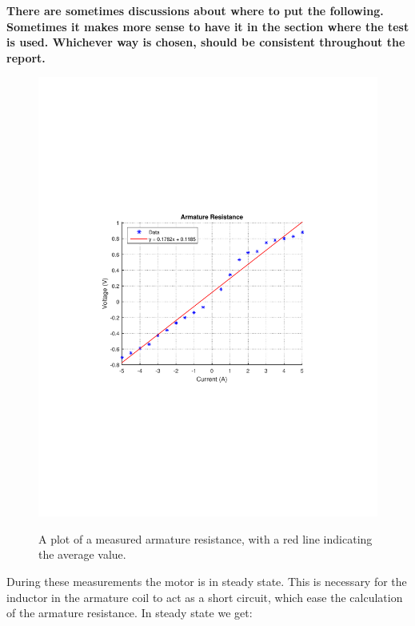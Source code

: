 \textbf{There are sometimes discussions about where to put the following. Sometimes it makes more sense to have it in the section where the test is used. Whichever way is chosen, should be consistent throughout the report.}

\begin{figure}[H]
  \centering
  {
    \includegraphics[width=\textwidth]{figures/armatureResistance.pdf}
  }
  \caption{A plot of a measured armature resistance, with a red line indicating the average value.}
  \label{armatureResistance}
\end{figure}

During these measurements the motor is in steady state. This is necessary for the inductor in the armature coil to act as a short circuit, which ease the calculation of the armature resistance. In steady state we get:

